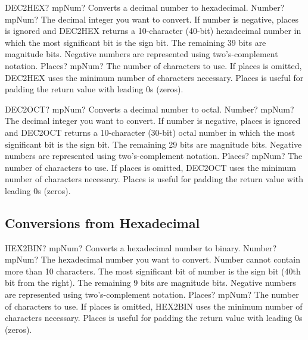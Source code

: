 \vspace{0.6cm}
\begin{mpFunctionsExtract}
	\mpWorksheetFunctionTwoNotImplemented
	{DEC2HEX? mpNum? Converts a decimal number to hexadecimal.}
	{Number? mpNum? The decimal integer you want to convert. If number is negative, places is ignored and DEC2HEX returns a 10-character (40-bit) hexadecimal number in which the most significant bit is the sign bit. The remaining 39 bits are magnitude bits. Negative numbers are represented using two's-complement notation.}
	{Places? mpNum? The number of characters to use. If places is omitted, DEC2HEX uses the minimum number of characters necessary. Places is useful for padding the return value with leading 0s (zeros).}
\end{mpFunctionsExtract}


\vspace{0.6cm}
\begin{mpFunctionsExtract}
	\mpWorksheetFunctionTwoNotImplemented
	{DEC2OCT? mpNum? Converts a decimal number to octal.}
	{Number? mpNum? The decimal integer you want to convert. If number is negative, places is ignored and DEC2OCT returns a 10-character (30-bit) octal number in which the most significant bit is the sign bit. The remaining 29 bits are magnitude bits. Negative numbers are represented using two's-complement notation.}
	{Places? mpNum? The number of characters to use. If places is omitted, DEC2OCT uses the minimum number of characters necessary. Places is useful for padding the return value with leading 0s (zeros).}
\end{mpFunctionsExtract}




\subsection{Conversions from Hexadecimal}


\begin{mpFunctionsExtract}
	\mpWorksheetFunctionTwoNotImplemented
	{HEX2BIN? mpNum? Converts a  hexadecimal number to binary.}
	{Number? mpNum? The hexadecimal number you want to convert. Number cannot contain more than 10 characters. The most significant bit of number is the sign bit (40th bit from the right). The remaining 9 bits are magnitude bits. Negative numbers are represented using two's-complement notation.}
	{Places? mpNum? The number of characters to use. If places is omitted, HEX2BIN uses the minimum number of characters necessary. Places is useful for padding the return value with leading 0s (zeros).}
\end{mpFunctionsExtract}


